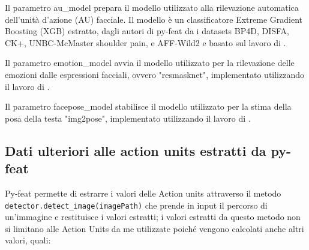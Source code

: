 Il parametro au\_model prepara il modello utilizzato alla rilevazione automatica dell'unità d'azione (AU) facciale. Il modello è un classificatore Extreme Gradient Boosting (XGB) estratto, dagli autori di py-feat da i datasets BP4D, DISFA, CK+, UNBC-McMaster shoulder pain, e AFF-Wild2 e basato sul lavoro di \cite{ChenG16}.

Il parametro emotion\_model avvia il modello utilizzato per la rilevazione delle emozioni dalle espressioni facciali, ovvero "resmasknet", implementato utilizzando il lavoro di \cite{FacialExprRecoUseResMaskNet}.

Il parametro facepose\_model stabilisce il modello utilizzato per la stima della posa della testa "img2pose", implementato utilizzando il lavoro di \cite{img2pose}.

\subsection{Dati ulteriori alle action units estratti da py-feat}
Py-feat permette di estrarre i valori delle Action units attraverso il metodo \texttt{detector.detect_image(imagePath)} che prende in input il percorso di un’immagine e restituisce i valori estratti; i valori estratti da questo metodo non si limitano alle Action Units da me utilizzate poiché vengono calcolati anche altri valori, quali:

